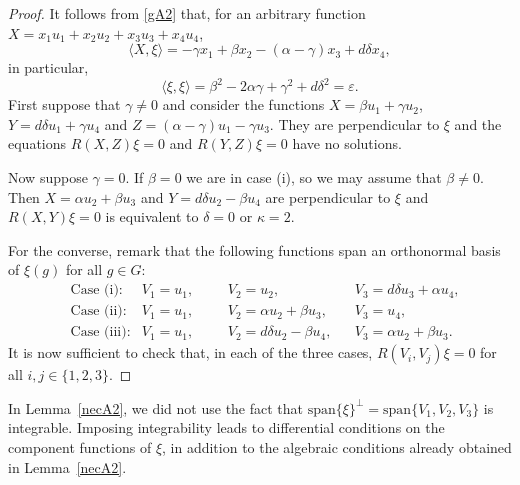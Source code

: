 \documentclass{amsart}
\theoremstyle{plain}
\theoremstyle{remark}
\begin{document}
{\begin{proof} It follows from \eqref{gA2} that, for an arbitrary function $X=x_1u_1+x_2u_2+x_3u_3+x_4u_4$, 
\[
\langle X,\xi\rangle=-\gamma x_1+ \beta x_2-( \alpha-\gamma)x_3+d\delta x_4,
\]
in particular,
\begin{equation}\label{nxiA2}
\langle \xi,\xi\rangle=\beta^2 -2\alpha \gamma +\gamma ^2 +d\delta^2 = \varepsilon.
\end{equation}
First suppose that $\gamma \neq 0$ and consider the functions $X =\beta u_1 + \gamma u_2$, $Y =d\delta u_1 + \gamma u_4$ and  $Z=(\alpha - \gamma)u_1 - \gamma u_3$. They are perpendicular to $\xi$ and the equations $R(X,Z)\xi = 0$ and $R(Y,Z)\xi =0$ have no solutions. 

Now suppose $\gamma = 0$. If $\beta = 0$ we are in case (i), so we may assume that $\beta \neq 0$. Then $X= \alpha u_2 + \beta u_3$ and $Y= d\delta u_2 - \beta u_4$ are perpendicular to $\xi$ and $R(X,Y)\xi = 0$ is equivalent to $\delta = 0$ or $\kappa = 2$. 

For the converse, remark that the following functions span an orthonormal basis of $\xi(g)$ for all $g\in G$:
\begin{align}
& \mbox{Case (i)}: & V_1=u_1, &&& V_2=u_2, && V_3=d\delta u_3+\alpha u_4, \label{basisA2i} \\
& \mbox{Case (ii)}: & V_1=u_1, &&& V_2=\alpha u_2+\beta u_3, && V_3=u_4, \label{basisA2ii} \\
& \mbox{Case (iii)}: & V_1=u_1, &&& V_2=d \delta u_2-\beta u_4, && V_3=\alpha u_2+\beta u_3. \label{basisA2iii}
\end{align}
It is now sufficient to check that, in each of the three cases, $R(V_i,V_j)\xi =0$ for all $i,j \in \{1,2,3\}$.
\end{proof}


In Lemma~\ref{necA2}, we did not use the fact that $\mathrm{span}\{\xi\}^{\perp}=\mathrm{span}\{V_1,V_2,V_3\}$ is integrable. Imposing integrability leads to differential conditions on the component functions of $\xi$, in addition to the algebraic conditions already obtained in Lemma~\ref{necA2}. 

}
\end{document}
